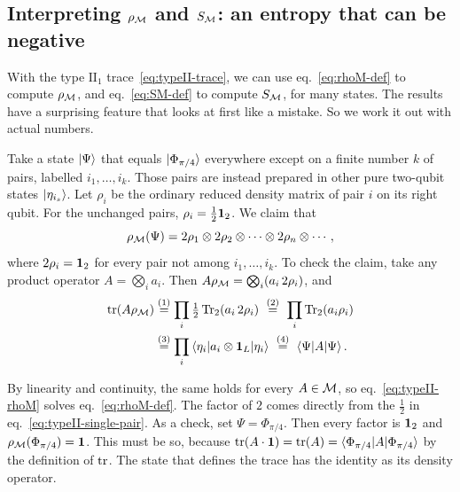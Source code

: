 \subsection*{Interpreting $\rho_{\mathcal{M}}$ and $S_{\mathcal{M}}$: an entropy that can be negative}

With the type $\mathrm{II}_1$ trace~\eqref{eq:typeII-trace}, we can use eq.~\eqref{eq:rhoM-def} to compute
$\rho_{\mathcal{M}}$, and eq.~\eqref{eq:SM-def} to compute $S_{\mathcal{M}}$, for many states. The results have a surprising feature
that looks at first like a mistake. So we work it out with actual numbers.

Take a state $\ket\Psi$ that equals $\ket{\Phi_{\pi/4}}$ everywhere except on a finite number $k$ of pairs,
labelled $i_1,\dots,i_k$. Those pairs are instead prepared in other pure two-qubit states $\ket{\eta_{i_s}}$.
Let $\rho_i$ be the ordinary reduced density matrix of pair $i$ on its right qubit. For the unchanged pairs,
$\rho_i=\tfrac12\mathbf{1}_2$. We claim that
\begin{equation}
\rho_{\mathcal{M}}(\Psi) = 2\rho_1\otimes2\rho_2\otimes\cdots\otimes2\rho_n\otimes\cdots ,
\label{eq:typeII-rhoM}
\end{equation}
where $2\rho_i=\mathbf{1}_2$ for every pair not among $i_1,\dots,i_k$. To check the claim, take any product operator
$A=\bigotimes_ia_i$. Then $A\rho_{\mathcal{M}}=\bigotimes_i(a_i\,2\rho_i)$, and
\begin{align}
\operatorname{tr}(A\rho_{\mathcal{M}})
&\overset{(1)}{=} \prod_i\tfrac12\operatorname{Tr}_2(a_i\,2\rho_i)
\ \overset{(2)}{=}\ \prod_i\operatorname{Tr}_2(a_i\rho_i) \notag\\
&\overset{(3)}{=} \prod_i\braket{\eta_i|a_i\otimes\mathbf{1}_L|\eta_i}
\ \overset{(4)}{=}\ \braket{\Psi|A|\Psi} . \notag
\end{align}
\quad
{}\quad
{}\quad
{}

By linearity and continuity, the same holds for every $A\in\mathcal{M}$, so eq.~\eqref{eq:typeII-rhoM} solves
eq.~\eqref{eq:rhoM-def}. The factor of $2$ comes directly from the $\tfrac12$ in
eq.~\eqref{eq:typeII-single-pair}. As a check, set $\Psi=\Phi_{\pi/4}$. Then every factor is $\mathbf{1}_2$ and
$\rho_{\mathcal{M}}(\Phi_{\pi/4})=\mathbf{1}$. This must be so, because $\operatorname{tr}(A\cdot\mathbf{1})=\operatorname{tr}(A)=\braket{\Phi_{\pi/4}|A|\Phi_{\pi/4}}$
by the definition of $\operatorname{tr}$. The state that defines the trace has the identity as its density operator.

